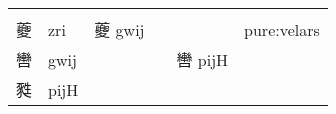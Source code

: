 \documentclass[14pt,a4paper]{scrartcl}
\begin{document}
\begin{longtable}[c]{@{}llllll@{}}
\begin{minipage}[t]{0.14\columnwidth}
\strut\end{minipage}\tabularnewline
\begin{minipage}[t]{0.14\columnwidth}\raggedright\strut
夔
\strut\end{minipage} &
\begin{minipage}[t]{0.14\columnwidth}\raggedright\strut
zri
\strut\end{minipage} &
\begin{minipage}[t]{0.14\columnwidth}\raggedright\strut
夔 gwij
\strut\end{minipage} &
\begin{minipage}[t]{0.14\columnwidth}\raggedright\strut
\strut\end{minipage} &
\begin{minipage}[t]{0.14\columnwidth}\raggedright\strut
\strut\end{minipage} &
\begin{minipage}[t]{0.14\columnwidth}\raggedright\strut
pure:velars
\strut\end{minipage}\tabularnewline
\begin{minipage}[t]{0.14\columnwidth}\raggedright\strut
轡
\strut\end{minipage} &
\begin{minipage}[t]{0.14\columnwidth}\raggedright\strut
gwij
\strut\end{minipage} &
\begin{minipage}[t]{0.14\columnwidth}\raggedright\strut
\strut\end{minipage} &
\begin{minipage}[t]{0.14\columnwidth}\raggedright\strut
\strut\end{minipage} &
\begin{minipage}[t]{0.14\columnwidth}\raggedright\strut
轡 pijH
\strut\end{minipage} &
\begin{minipage}[t]{0.14\columnwidth}\raggedright\strut
\strut\end{minipage}\tabularnewline
\begin{minipage}[t]{0.14\columnwidth}\raggedright\strut
甤
\strut\end{minipage} &
\begin{minipage}[t]{0.14\columnwidth}\raggedright\strut
pijH
\strut\end{minipage} &
\begin{minipage}[t]{0.14\columnwidth}\raggedright\strut
\strut\end{minipage} &
\begin{minipage}[t]{0.14\columnwidth}\raggedright\strut

\end{minipage}
\end{longtable}
\end{document}
